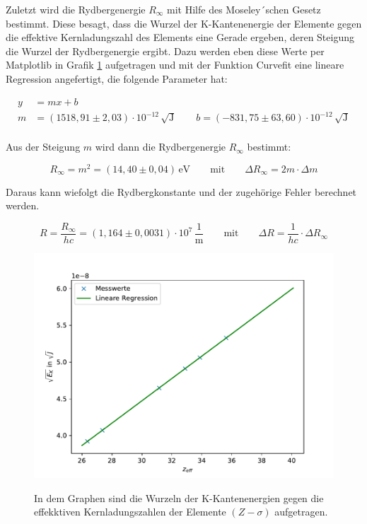 \documentclass[titlepage = firstcover]{scrartcl}
\begin{document}
            \FloatBarrier
            \noindent
            Zuletzt wird die Rydbergenergie $R_{\infty}$ mit Hilfe des  Moseley´schen Gesetz bestimmt. Diese besagt, dass die Wurzel der K-Kantenenergie der Elemente gegen die effektive 
            Kernladungszahl des Elements eine Gerade ergeben, deren Steigung die Wurzel der Rydbergenergie ergibt. Dazu werden eben diese Werte per Matplotlib in Grafik \ref{fig:Moseley} 
            aufgetragen und mit der Funktion Curvefit eine lineare Regression angefertigt, die folgende Parameter hat:

            \begin{align*}
              y &= mx + b \\
              m &= (1518,91 \pm 2,03) \cdot 10^{-12} \, \sqrt{\text{J}}  \qquad b = (-831,75 \pm 63,60) \cdot 10^{-12} \, \sqrt{\text{J}}\\
            \end{align*}

            \noindent
            Aus der Steigung $m$ wird dann die Rydbergenergie $R_{\infty}$ bestimmt:

            \begin{equation*}
              R_{\infty} = m^2 = (14,40 \pm 0,04) \, \text{eV} \qquad \text{mit} \qquad \Delta R_{\infty} = 2m \cdot \Delta m
            \end{equation*}

            \noindent
            Daraus kann wiefolgt die Rydbergkonstante und der zugehörige Fehler berechnet werden.

            \begin{equation*}
              R = \frac{R_{\infty}}{hc} = (1,164 \pm 0,0031) \cdot 10^{7} \, \frac{1}{\text{m}} \qquad \text{mit} \qquad \Delta R = \frac{1}{hc} \cdot \Delta R_{\infty}
            \end{equation*}
            
            \FloatBarrier
            \begin{figure}[h]
              \centering
              \caption{In dem Graphen sind die Wurzeln der K-Kantenenergien gegen die effekktiven Kernladungszahlen der Elemente $(Z-\sigma)$ aufgetragen.}
              \includegraphics{Moseley.pdf}
              \label{fig:Moseley}
            \end{figure}
            \FloatBarrier
\end{document}
